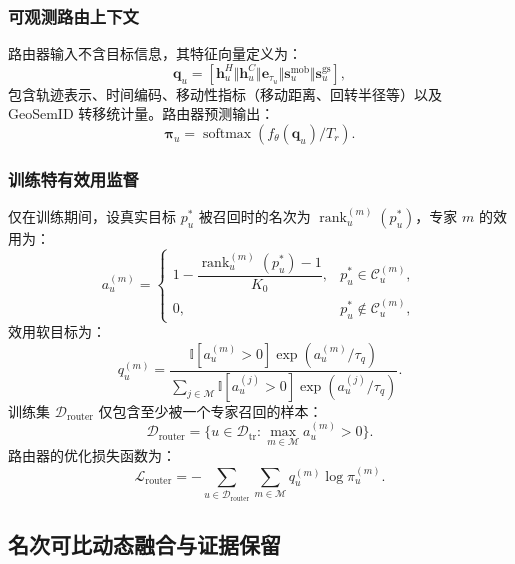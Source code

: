 \documentclass[10pt,fontset=none,twocolumn]{ctexart}
\newcommand{\Experts}{\mathcal{M}}
\newcommand{\Train}{\mathcal{D}_{\mathrm{tr}}}
\newcommand{\Ind}{\mathbb{I}}
\begin{document}
\subsubsection{可观测路由上下文}

路由器输入不含目标信息，其特征向量定义为：
\begin{equation}
\bm{q}_{u}
=
[
\bm{h}_{u}^{H}
\Vert
\bm{h}_{u}^{C}
\Vert
\bm{e}_{\tau_u}
\Vert
\bm{s}_{u}^{\mathrm{mob}}
\Vert
\bm{s}_{u}^{\mathrm{gs}}
],
\label{eq:routing_context}
\end{equation}
包含轨迹表示、时间编码、移动性指标（移动距离、回转半径等）以及 GeoSemID 转移统计量。路由器预测输出：
\begin{equation}
\bm{\pi}_{u}
=
\operatorname{softmax}(f_{\theta}(\bm{q}_{u})/T_r).
\label{eq:router_output}
\end{equation}

\subsubsection{训练特有效用监督}

仅在训练期间，设真实目标 $p_u^*$ 被召回时的名次为 $\operatorname{rank}_u^{(m)}(p_u^*)$，专家 $m$ 的效用为：
\begin{equation}
a_{u}^{(m)}
=
\begin{cases}
1-\dfrac{\operatorname{rank}_{u}^{(m)}(p_u^{*})-1}{K_0},
&p_u^{*}\in\mathcal{C}_{u}^{(m)},\\[7pt]
0,&p_u^{*}\notin\mathcal{C}_{u}^{(m)},
\end{cases}
\label{eq:expert_utility}
\end{equation}
效用软目标为：
\begin{equation}
q_{u}^{(m)}
=
\frac{
\Ind[a_u^{(m)}>0]\exp(a_{u}^{(m)}/\tau_q)
}{
\sum_{j\in\Experts}
\Ind[a_u^{(j)}>0]\exp(a_{u}^{(j)}/\tau_q)
}.
\label{eq:utility_target}
\end{equation}
训练集 $\mathcal{D}_{\mathrm{router}}$ 仅包含至少被一个专家召回的样本：
\begin{equation}
\mathcal{D}_{\mathrm{router}}
=
\{u\in\Train:\max_{m\in\Experts}a_u^{(m)}>0\}.
\label{eq:router_training_set}
\end{equation}
路由器的优化损失函数为：
\begin{equation}
\mathcal{L}_{\mathrm{router}}
=
-
\sum_{u\in\mathcal{D}_{\mathrm{router}}}
\sum_{m\in\Experts}
q_{u}^{(m)}\log\pi_{u}^{(m)}.
\label{eq:router_loss}
\end{equation}

\subsection{名次可比动态融合与证据保留}
\label{subsec:fusion}
\end{document}
